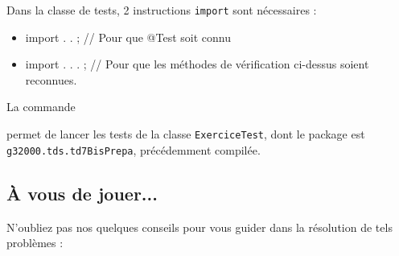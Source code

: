 \documentclass[11pt,a4paper]{article}
\begin{document}
            \par
        
                Dans la classe de tests, 2 instructions \verb|import| sont n\'ecessaires :    
							
					\begin{itemize}
				
			\item import  \textcolor{gray}{\underline{\hspace*{2em}}} . \textcolor{gray}{\underline{\hspace*{3em}}} . \textcolor{gray}{\underline{\hspace*{3em}}} ; 
                // Pour que @Test soit connu
                
			\item import  \textcolor{gray}{\underline{\hspace*{5em}}}  \textcolor{gray}{\underline{\hspace*{2em}}} . \textcolor{gray}{\underline{\hspace*{3em}}} . \textcolor{gray}{\underline{\hspace*{5em}}} . \textcolor{gray}{\underline{\hspace*{1em}}} ; 
                // Pour que les m\'ethodes de v\'erification ci-dessus soient reconnues.
                
					\end{itemize}
				
            \par
            
								La commande
								\par
				 \textcolor{gray}{\underline{\hspace*{3em}}}  \textcolor{gray}{\underline{\hspace*{16em}}}  \textcolor{gray}{\underline{\hspace*{20em}}}  \par
				
								permet de lancer les tests de la classe \verb|ExerciceTest|, 
								dont le package est \verb|g32000.tds.td7BisPrepa|, pr\'ec\'edemment compil\'ee.    
							
            \par
        \subsection{\`A vous de jouer...}
          N'oubliez pas nos quelques conseils pour vous guider dans la r\'esolution de tels probl\`emes :
          
\end{document}
